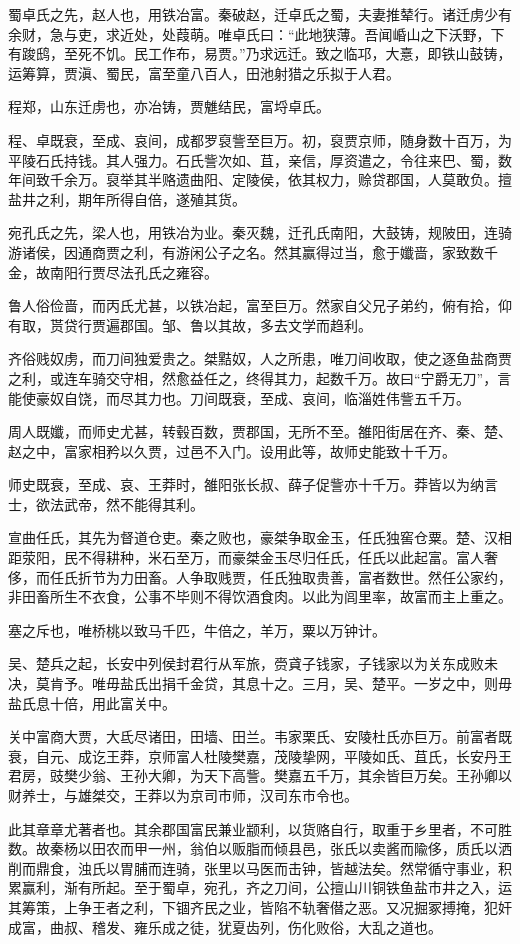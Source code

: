 \documentclass[]{article}
\begin{document}
蜀卓氏之先，赵人也，用铁冶富。秦破赵，迁卓氏之蜀，夫妻推辇行。诸迁虏少有余财，急与吏，求近处，处葭萌。唯卓氏曰：``此地狭薄。吾闻崏山之下沃野，下有踆鸱，至死不饥。民工作布，易贾。''乃求远迁。致之临邛，大憙，即铁山鼓铸，运筹算，贾滇、蜀民，富至童八百人，田池射猎之乐拟于人君。

程郑，山东迁虏也，亦冶铸，贾魋结民，富埒卓氏。

程、卓既衰，至成、哀间，成都罗裒訾至巨万。初，裒贾京师，随身数十百万，为平陵石氏持钱。其人强力。石氏訾次如、苴，亲信，厚资遣之，令往来巴、蜀，数年间致千余万。裒举其半赂遗曲阳、定陵侯，依其权力，赊贷郡国，人莫敢负。擅盐井之利，期年所得自倍，遂殖其货。

宛孔氏之先，梁人也，用铁冶为业。秦灭魏，迁孔氏南阳，大鼓铸，规陂田，连骑游诸侯，因通商贾之利，有游闲公子之名。然其赢得过当，愈于孅啬，家致数千金，故南阳行贾尽法孔氏之雍容。

鲁人俗俭啬，而丙氏尤甚，以铁冶起，富至巨万。然家自父兄子弟约，俯有拾，仰有取，贳贷行贾遍郡国。邹、鲁以其故，多去文学而趋利。

齐俗贱奴虏，而刀间独爱贵之。桀黠奴，人之所患，唯刀间收取，使之逐鱼盐商贾之利，或连车骑交守相，然愈益任之，终得其力，起数千万。故曰``宁爵无刀''，言能使豪奴自饶，而尽其力也。刀间既衰，至成、哀间，临淄姓伟訾五千万。

周人既孅，而师史尤甚，转毂百数，贾郡国，无所不至。雒阳街居在齐、秦、楚、赵之中，富家相矜以久贾，过邑不入门。设用此等，故师史能致十千万。

师史既衰，至成、哀、王莽时，雒阳张长叔、薛子促訾亦十千万。莽皆以为纳言士，欲法武帝，然不能得其利。

宣曲任氏，其先为督道仓吏。秦之败也，豪桀争取金玉，任氏独窖仓粟。楚、汉相距荥阳，民不得耕种，米石至万，而豪桀金玉尽归任氏，任氏以此起富。富人奢侈，而任氏折节为力田畜。人争取贱贾，任氏独取贵善，富者数世。然任公家约，非田畜所生不衣食，公事不毕则不得饮酒食肉。以此为闾里率，故富而主上重之。

塞之斥也，唯桥桃以致马千匹，牛倍之，羊万，粟以万钟计。

吴、楚兵之起，长安中列侯封君行从军旅，赍貣子钱家，子钱家以为关东成败未决，莫肯予。唯毋盐氏出捐千金贷，其息十之。三月，吴、楚平。一岁之中，则毋盐氏息十倍，用此富关中。

关中富商大贾，大氐尽诸田，田墙、田兰。韦家栗氏、安陵杜氏亦巨万。前富者既衰，自元、成讫王莽，京师富人杜陵樊嘉，茂陵挚网，平陵如氏、苴氏，长安丹王君房，豉樊少翁、王孙大卿，为天下高訾。樊嘉五千万，其余皆巨万矣。王孙卿以财养士，与雄桀交，王莽以为京司市师，汉司东市令也。

此其章章尤著者也。其余郡国富民兼业颛利，以货赂自行，取重于乡里者，不可胜数。故秦杨以田农而甲一州，翁伯以贩脂而倾县邑，张氏以卖酱而隃侈，质氏以洒削而鼎食，浊氏以胃脯而连骑，张里以马医而击钟，皆越法矣。然常循守事业，积累赢利，渐有所起。至于蜀卓，宛孔，齐之刀间，公擅山川铜铁鱼盐市井之入，运其筹策，上争王者之利，下锢齐民之业，皆陷不轨奢僣之恶。又况掘冢搏掩，犯奸成富，曲叔、稽发、雍乐成之徒，犹夏齿列，伤化败俗，大乱之道也。
\end{document}

